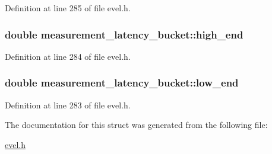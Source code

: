 Definition at line 285 of file evel.\+h.

\hypertarget{structmeasurement__latency__bucket_a756a7061a0ef701d06919a42ceca18e0}{}
\subsubsection[{high\+\_\+end}]{\setlength{\rightskip}{0pt plus 5cm}double measurement\+\_\+latency\+\_\+bucket\+::high\+\_\+end}\label{structmeasurement__latency__bucket_a756a7061a0ef701d06919a42ceca18e0}


Definition at line 284 of file evel.\+h.

\hypertarget{structmeasurement__latency__bucket_ac8d430db34586faa9738b34fb3820a20}{}
\subsubsection[{low\+\_\+end}]{\setlength{\rightskip}{0pt plus 5cm}double measurement\+\_\+latency\+\_\+bucket\+::low\+\_\+end}\label{structmeasurement__latency__bucket_ac8d430db34586faa9738b34fb3820a20}


Definition at line 283 of file evel.\+h.



The documentation for this struct was generated from the following file\+:\begin{DoxyCompactItemize}
\item 
\hyperlink{evel_8h}{evel.\+h}\end{DoxyCompactItemize}
